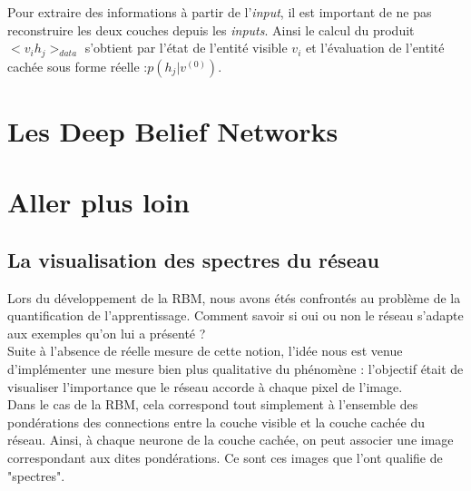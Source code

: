 \documentclass[a4paper,oneside]{report}
\begin{document}
                Pour extraire des informations à partir de l'\textit{input}, il est important de ne pas reconstruire les deux couches depuis les \textit{inputs}.
                Ainsi le calcul du produit\begin{math}<v_{i}h_{j}>_{data}\end{math} s'obtient par l'état de l'entité visible \begin{math}v_{i}\end{math} et l'évaluation de l'entité cachée sous forme réelle :\begin{math}p(h_{j}|v^{(0)})\end{math}.


                				

        \chapter{Les Deep Belief Networks}



        \chapter{Aller plus loin}

            \section{La visualisation des spectres du réseau}

                Lors du développement de la RBM, nous avons étés confrontés au problème de la quantification de l'apprentissage. Comment savoir si oui ou non le réseau s'adapte aux exemples qu'on lui a présenté ?\\

                Suite à l'absence de réelle mesure de cette notion, l'idée nous est venue d'implémenter une mesure bien plus qualitative du phénomène : l'objectif était de visualiser l'importance que le réseau accorde à chaque pixel de l'image.\\

                Dans le cas de la RBM, cela correspond tout simplement à l'ensemble des pondérations des connections entre la couche visible et la couche cachée du réseau. Ainsi, à chaque neurone de la couche cachée, on peut associer une image correspondant aux dites pondérations. Ce sont ces images que l'ont qualifie de "spectres".
\end{document}

